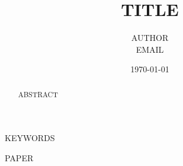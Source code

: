 \documentclass{IEEEtran}
\title{~TITLE~}
\author{ ~AUTHOR~  \\ ~EMAIL~}
\date{\today}
\begin{document}
\maketitle

\begin{abstract}
~ABSTRACT~
\end{abstract}

\begin{IEEEkeywords}
~KEYWORDS~
\end{IEEEkeywords}

~PAPER~

\printbibliography 
\end{document}
